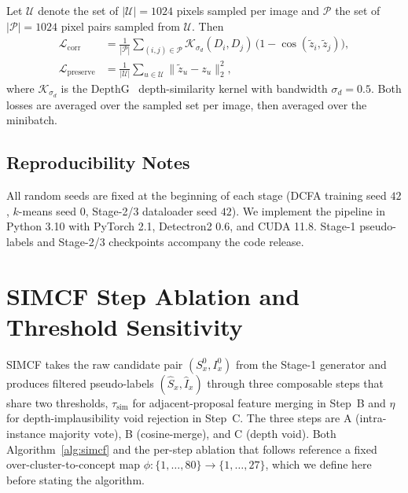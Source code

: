\documentclass{article}
\newcounter{algorithm}
\begin{document}
Let $\mathcal{U}$ denote the set of $|\mathcal{U}| = 1024$ pixels sampled per image and $\mathcal{P}$ the set of $|\mathcal{P}| = 1024$ pixel pairs sampled from $\mathcal{U}$. Then
\begin{align*}
\mathcal{L}_\text{corr} &= \tfrac{1}{|\mathcal{P}|}\!\!\sum_{(i,j)\in\mathcal{P}} \mathcal{K}_{\sigma_d}(D_i, D_j)\,\big(1 - \cos(\tilde z_i, \tilde z_j)\big), \\
\mathcal{L}_\text{preserve} &= \tfrac{1}{|\mathcal{U}|} \sum_{u \in \mathcal{U}} \|\tilde z_u - z_u\|_2^2,
\end{align*}
where $\mathcal{K}_{\sigma_d}$ is the DepthG~\cite{sick2024depthg} depth-similarity kernel with bandwidth $\sigma_d=0.5$. Both losses are averaged over the sampled set per image, then averaged over the minibatch.

\subsection{Reproducibility Notes}
\label{sec:supp:impl:repro}

All random seeds are fixed at the beginning of each stage (DCFA training seed $42$, $k$-means seed $0$, Stage-2/3 dataloader seed $42$). We implement the pipeline in Python 3.10 with PyTorch 2.1, Detectron2 0.6, and CUDA 11.8. Stage-1 pseudo-labels and Stage-2/3 checkpoints accompany the code release.

\section{SIMCF Step Ablation and Threshold Sensitivity}
\label{sec:supp:simcf_sweep}

SIMCF takes the raw candidate pair $(S_x^0, I_x^0)$ from the Stage-1 generator and produces filtered pseudo-labels $(\hat S_x, \hat I_x)$ through three composable steps that share two thresholds, $\tau_\text{sim}$ for adjacent-proposal feature merging in Step~B and $\eta$ for depth-implausibility void rejection in Step~C. The three steps are A (intra-instance majority vote), B (cosine-merge), and C (depth void). Both Algorithm~\ref{alg:simcf} and the per-step ablation that follows reference a fixed over-cluster-to-concept map $\phi : \{1, \dots, 80\} \to \{1, \dots, 27\}$, which we define here before stating the algorithm.
\end{document}
